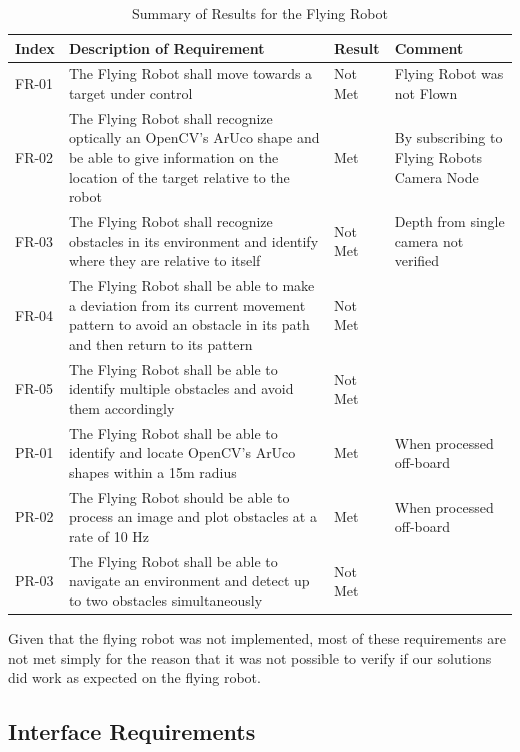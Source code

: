 \documentclass{article}[12]
\begin{document}
	\begin{table}[H]
  \small
		\begin{tabular}{p{2cm} p{8cm} p{2cm} p{3cm}}
			\hline
			{\textbf{Index}} & {\textbf{Description of Requirement}} & {\textbf{Result}} & {\textbf{Comment}} \\ \hline
FR-01 & The Flying Robot shall move towards a target under control & Not Met & Flying Robot was not Flown \\
FR-02 & The Flying Robot shall recognize optically an OpenCV's ArUco shape and be able to give information on the location of the target relative to the robot & Met & By subscribing to Flying Robots Camera Node\\
FR-03 & The Flying Robot shall recognize obstacles in its environment and identify where they are relative to itself & Not Met & Depth from single camera not verified\\
FR-04 & The Flying Robot shall be able to make a deviation from its current movement pattern to avoid an obstacle in its path and then return to its pattern & Not Met &  \\
FR-05 & The Flying Robot shall be able to identify multiple obstacles and avoid them accordingly & Not Met  &\\
PR-01 & The Flying Robot shall be able to identify and locate OpenCV's ArUco shapes within a 15m radius & Met & When processed off-board\\
PR-02 & The Flying Robot should be able to process an image and plot obstacles at a rate of 10 Hz & Met & When processed off-board \\
PR-03 & The Flying Robot shall be able to navigate an environment and detect up to two obstacles simultaneously & Not Met & \\ \hline
		\end{tabular}
		\caption{Summary of Results for the Flying Robot}
		\label{table:uavresults}
 \end{table}

Given that the flying robot was not implemented, most of these requirements are not met simply for the reason that it was not possible to verify if our solutions did work as expected on the flying robot.

 \subsection{Interface Requirements}
\end{document}
